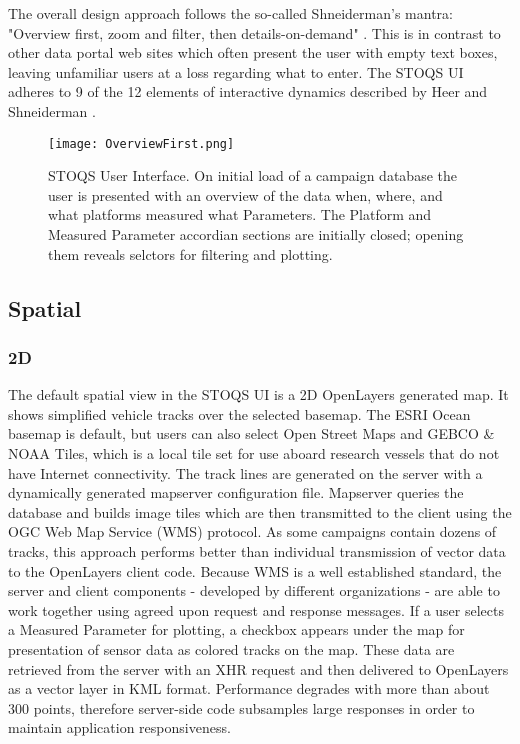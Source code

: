 \documentclass[conference]{IEEEtran}
\begin{document}
The overall design approach follows the so-called Shneiderman's mantra: "Overview first, zoom and filter, then details-on-demand" \cite{Whitney:2012:DIN:2597850}. This is in contrast to other data portal web sites which often present the user with empty text boxes, leaving unfamiliar users at a loss regarding what to enter. The STOQS UI adheres to 9 of the 12 elements of interactive dynamics described by Heer and Shneiderman \cite{Heer:2012:IDV:2133416.2146416}.

\begin{figure*}[htbp]
\centering
\texttt{[image: OverviewFirst.png]}
\caption{STOQS User Interface. On initial load of a campaign database the user is presented 
with an overview of the data when, where, and what platforms measured what Parameters. The 
Platform and Measured Parameter accordian sections are initially closed; opening them 
reveals selctors for filtering and plotting.}
\label{fig:OverviewFirst.png}
\end{figure*}

\subsection{Spatial}

\subsubsection{2D}
The default spatial view in the STOQS UI is a 2D OpenLayers generated map. It shows simplified vehicle tracks over the selected basemap. The ESRI Ocean basemap is default, but users can also select Open Street Maps and GEBCO \& NOAA Tiles, which is a local tile set for use aboard research vessels that do not have Internet connectivity. The track lines are generated on the server with a dynamically generated mapserver configuration file. Mapserver queries the database and builds image tiles which are then transmitted to the client using the OGC Web Map Service (WMS) protocol. As some campaigns contain dozens of tracks, this approach performs better than individual transmission of vector data to the OpenLayers client code. Because WMS is a well established standard, the server and client components - developed by different organizations - are able to work together using agreed upon request and response messages. If a user selects a Measured Parameter for plotting, a checkbox appears under the map for presentation of sensor data as colored tracks on the map. These data are retrieved from the server with an XHR request and then delivered to OpenLayers as a vector layer in KML format. Performance degrades with more than about 300 points, therefore server-side code subsamples large responses in order to maintain application responsiveness.
\end{document}
